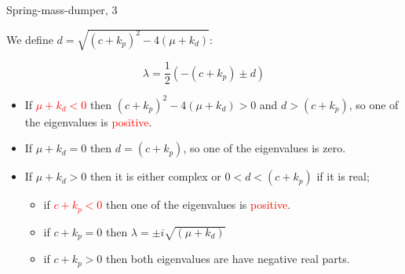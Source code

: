 \documentclass{beamer}
\begin{document}
\begin{frame}{Spring-mass-dumper, 3}
	\begin{flushleft}
		
		
		We define $d = \sqrt{(c+k_p)^2 - 4 (\mu + k_d)}$:
		
		\begin{equation}
			\lambda = \frac{1}{2} \left( - (c+k_p) \pm d \right)
		\end{equation}
		
		
\begin{itemize}
	\item 
	If \textcolor{red}{$\mu + k_d < 0$} then $(c+k_p)^2 - 4 (\mu + k_d) > 0$ and $d > (c+k_p)$, so one of the eigenvalues is \textcolor{red}{positive}.
	
	\item 
	If \textcolor{myblue}{$\mu + k_d = 0$} then $d = (c+k_p)$, so one of the eigenvalues is \textcolor{myblue}{zero}.
	
	\item 
	If \textcolor{mydarkgreen}{$\mu + k_d > 0$} then it is either complex or $0 < d < (c+k_p)$ if it is real;
	
	\begin{itemize}
		\item if \textcolor{red}{$c+k_p < 0$} then one of the eigenvalues is \textcolor{red}{positive}.
		
		\item if \textcolor{myblue}{$c+k_p = 0$} then $\lambda = \pm  i \sqrt{ (\mu + k_d)}$
		
		\item if \textcolor{mydarkgreen}{$c+k_p > 0$} then both eigenvalues are have \textcolor{mydarkgreen}{negative} real parts.
	\end{itemize}
	
\end{itemize}
		
		
		
	\end{flushleft}
\end{frame}
\end{document}
